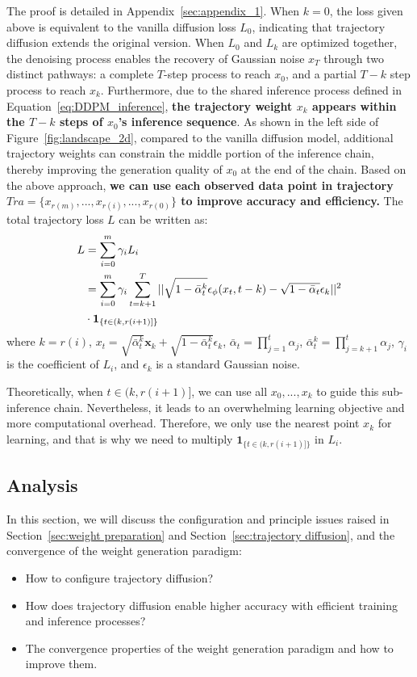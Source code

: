 The proof is detailed in Appendix~\ref{sec:appendix_1}. When $k=0$, the loss given above is equivalent to the vanilla diffusion loss $L_0$, indicating that trajectory diffusion extends the original version. When $L_0$ and $L_k$ are optimized together, the denoising process enables the recovery of Gaussian noise $x_T$ through two distinct pathways: a complete $T$-step process to reach $x_0$, and a partial $T-k$ step process to reach $x_k$. Furthermore, due to the shared inference process defined in Equation~\ref{eq:DDPM_inference}, \textbf{the trajectory weight $x_k$  appears within the $T-k$ steps of $x_0$'s inference sequence}. As shown in the left side of Figure~\ref{fig:landscape_2d}, compared to the vanilla diffusion model, additional trajectory weights can constrain the middle portion of the inference chain, thereby improving the generation quality of $x_0$ at the end of the chain. Based on the above approach, \textbf{we can use each observed data point in trajectory $Tra=\{x_{r(m)},...,x_{r(i)},...,x_{r(0)}\}$ to improve accuracy and efficiency.} The total trajectory loss $L$ can be written as: 
\begin{align}\label{eq:total_loss}
    L&=\sum_{i=0}^{m} \gamma_i L_i\notag\\
    &=\sum_{i=0}^{m} \gamma_i \sum_{t=k+1}^T||\sqrt{1-\bar{\alpha}_t^k}\epsilon_{\phi}(x_t, t-k)-\sqrt{1-\bar{\alpha}_t}\epsilon_k||^2 \notag\\
    &\cdot \mathbf{1}_{\{t \in (k,r(i+1)]\}}
\end{align}
where $k=r(i)$, $x_t=\sqrt{\bar{\alpha}^k_t} \mathbf{x}_k + \sqrt{1 - \bar{\alpha}^k_t}\epsilon_k$, $\bar{\alpha}_t=\prod_{j=1}^t \alpha_j$, $\bar{\alpha}^k_t=\prod_{j=k+1}^t \alpha_j$, $\gamma_i$ is the coefficient of $L_i$, and $\epsilon_k$ is a standard Gaussian noise.

Theoretically, when $t \in (k,r(i+1)]$, we can use all $x_0,...,x_k$ to guide this sub-inference chain. Nevertheless, it leads to an overwhelming learning objective and more computational overhead. Therefore, we only use the nearest point $x_k$ for learning, and that is why we need to multiply $\mathbf{1}_{\{t \in (k,r(i+1)]\}}$ in $L_i$.

\subsection{Analysis}\label{sec:analysis}
In this section, we will discuss the configuration and principle issues raised in Section~\ref{sec:weight preparation} and Section~\ref{sec:trajectory diffusion}, and the convergence of the weight generation paradigm:
\begin{itemize}
    \item How to configure trajectory diffusion?
    \item How does trajectory diffusion enable higher accuracy with efficient training and inference processes?
    \item The convergence properties of the weight generation paradigm and how to improve them.
\end{itemize}

